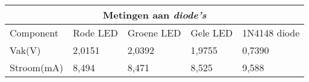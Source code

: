 \begin{tabular}{ |p{2.3cm}||p{2.3cm}|p{2.3cm}|p{2.3cm}|p{2.3cm}|  }
 \hline
 \multicolumn{5}{|c|}{Metingen aan \textit{diode's}} \\
 \hline
  Component & Rode LED& Groene LED& Gele LED &1N4148 diode\\
 \hline
 Vak(V)   &2,0151 &2,0392& 1,9755 &0,7390\\
 \hline
Stroom(mA) &8,494 &8,471 &8,525 &9,588\\
 \hline
 \end{tabular}
 